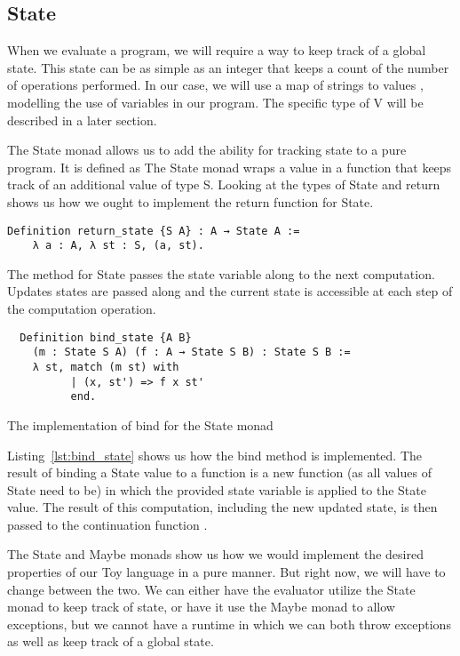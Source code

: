 \subsection{State}
When we evaluate a program, we will require a way to keep track of a global
state. This state can be as simple as an integer that keeps a count of the
number of operations performed. In our case, we will use a map of strings to
values ,  modelling the use of variables in our program. The specific type 
of V will be described in a later section.

The State monad allows us to add the ability for tracking state to a pure
program. It is defined as  
The State monad wraps a value in a function that keeps track of an additional value of
type S. Looking at the types of State and return shows us how we ought to
implement the return function for State. 

\begin{verbatim}
Definition return_state {S A} : A → State A := 
    λ a : A, λ st : S, (a, st).
\end{verbatim}

The  method for State passes the state variable along to the next
computation. Updates states are passed along and the current state is
accessible at each step of the computation operation.

\begin{listing}[H]
\begin{verbatim}
  Definition bind_state {A B} 
    (m : State S A) (f : A → State S B) : State S B :=
    λ st, match (m st) with
          | (x, st') => f x st'
          end.
\end{verbatim}
\caption{The implementation of bind for the State monad}
\label{lst:bind_state}
\end{listing}

Listing~\ref{lst:bind_state} shows us how the bind method is implemented. The
result of binding a State value to a function is a new function (as all values
of State need to be) in which the provided state variable is applied to the
State value. The result of this computation, including the new updated state,
is then passed to the continuation function .

The State and Maybe monads show us how we would implement the desired
properties of our Toy language in a pure manner. But right now, we will have to
change between the two. We can either have the evaluator utilize the State
monad to keep track of state, or have it use the Maybe monad to allow
exceptions, but we cannot have a runtime in which we can both throw exceptions
as well as keep track of a global state. 


